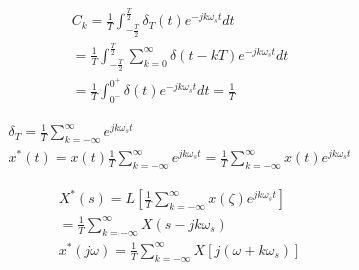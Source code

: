 \begin{frame}
\begin{block}{}
\begin{eqnarray*}
C_k=\frac{1}{T}\int_{-\frac{T}{2}}^{\frac{T}{2}}\delta_T(t)e^{-jk\omega_st}dt\\
=\frac{1}{T}\int_{-\frac{T}{2}}^{\frac{T}{2}}\sum\limits_{k=0}^\infty\delta(t-kT)e^{-jk\omega_st}dt\\
=\frac{1}{T}\int_{0^-}^{0^+}\delta(t)e^{-jk\omega_st}dt=\frac{1}{T}
\end{eqnarray*}
\end{block}
\end{frame}

\begin{frame}
\begin{block}{}
\begin{eqnarray*}
\delta_T=\frac{1}{T}\sum\limits_{k=-\infty}^\infty e^{jk\omega_st}\\
x^*(t)=x(t)\frac{1}{T}\sum\limits_{k=-\infty}^\infty e^{jk\omega_st}=\frac{1}{T}\sum\limits_{k=-\infty}^\infty x(t)e^{jk\omega_st}
\end{eqnarray*}
\end{block}
\end{frame}

\begin{frame}
\begin{block}{}
\begin{eqnarray*}
X^*(s)=L[\frac{1}{T}\sum\limits_{k=-\infty}^\infty x(\zeta)e^{jk\omega_st}]\\
=\frac{1}{T}\sum\limits_{k=-\infty}^\infty X(s-jk\omega_s)\\
x^*(j\omega)=\frac{1}{T}\sum\limits_{k=-\infty}^\infty X[j(\omega+k\omega_s)]
\end{eqnarray*}
\end{block}
\end{frame}

